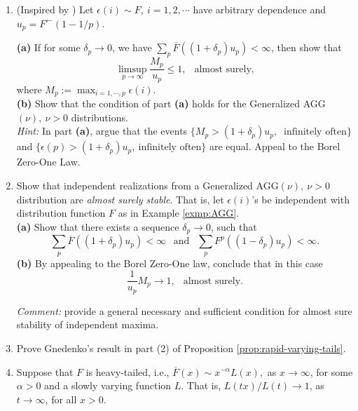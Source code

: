 
\begin{enumerate}

 \item (Inspired by \cite{resnick1973almost}) Let $\epsilon(i)\sim F,\ i=1,2,\cdots$ have arbitrary dependence 
 and $u_p = F^{\leftarrow}(1-1/p)$. 
 
 {\bf (a)}   If for some $\delta_p\to 0$,
 we have $\sum_{p} \overline{F}((1+\delta_p)u_p) <\infty$, then show that
 $$
 \limsup_{p\to\infty} \frac{M_p}{u_p} \le 1,\ \ \mbox{ almost surely,} 
 $$
 where $M_p:= \max_{i=1,\cdots,p} \epsilon(i)$.\\
 
 {\bf (b)} Show that the condition of part {\bf (a)} holds for the Generalized AGG$(\nu),\ \nu>0$ distributions.\\
 
 {\em Hint:} In part {\bf (a)}, argue that the events $\{ M_p > (1+\delta_p) u_p,\ \mbox{ infinitely often}\}$ and
  $\{\epsilon(p) > (1+\delta_p)u_p, \ \mbox{infinitely often}\}$ are equal. Appeal to the Borel Zero-One Law.\\
 
 \item  Show that independent realizations from a Generalized AGG$(\nu),\ \nu>0$ distribution
  are {\em almost surely stable}. That is, let $\epsilon(i)$'s be independent with distribution function $F$ as in Example \ref{exmp:AGG}.\\

{\bf (a)} Show that there exists a sequence $\delta_p\to 0$, such that 
$$
\sum_p \overline F((1+\delta_p)u_p) <\infty\ \ \mbox{ and }\ \  \sum_p F^p((1-\delta_p)u_p) <\infty.
$$
 {\bf (b)} By appealing to the Borel Zero-One law, conclude that in this case
 $$
 \frac{1}{u_p} M_p {\longrightarrow} 1,\ \ \mbox{ almost surely}.
 $$

{\em Comment:} 
\cite{resnick1973almost} provide a general necessary and sufficient condition for almost sure stability of independent maxima.\\
 
 \item Prove Gnedenko's result in part (2) of Proposition \ref{prop:rapid-varying-tails}.\\
 
\item Suppose that $F$ is heavy-tailed, i.e., $\overline F(x) \sim x^{-\alpha} L(x),$ as $x\to\infty$, for some $\alpha>0$ and a
slowly varying function $L$.  That is, $L(tx)/L(t)\to 1$, as $t\to\infty$, for all $x>0$.\\


\end{enumerate}

